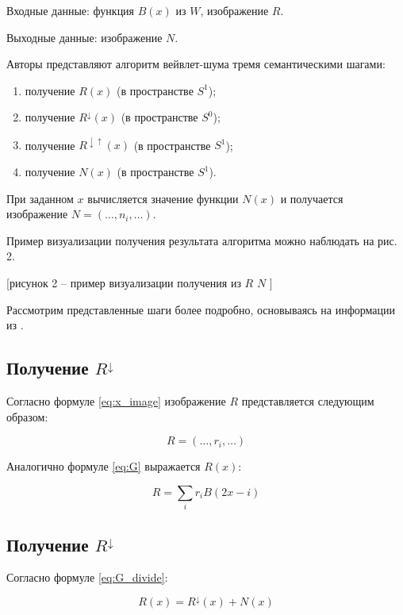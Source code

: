 Входные данные: функция $B(x)$ из $W$, изображение $R$.

Выходные данные: изображение $N$.

Авторы \cite{pixar} представляют алгоритм вейвлет-шума тремя семантическими шагами:

\begin{enumerate}
	\item получение $R(x)$ (в пространстве $S^1$);
	\item получение $R^\downarrow(x)$ (в пространстве $S^0$);
	\item получение $R^{\downarrow\uparrow}(x)$ (в пространстве $S^1$);
	\item получение $N(x)$ (в пространстве $S^1$).
\end{enumerate}

При заданном $x$ вычисляется значение функции $N(x)$ и получается изображение $N=(\dots,n_i,\dots)$.

Пример визуализации получения результата алгоритма можно наблюдать на рис. 2.

[рисунок 2 -- пример визуализации получения из $R$ $N$ \cite{pixar}]

Рассмотрим представленные шаги более подробно, основываясь на информации из \cite{pixar}.

\subsection{Получение $R^\downarrow$}

Согласно формуле \ref{eq:x_image} изображение $R$ представляется следующим образом:

\begin{equation}\label{eq:R_image}
	R=(\dots,r_i,\dots)
\end{equation}

Аналогично формуле \ref{eq:G} выражается $R(x)$:

\begin{equation}\label{eq:R}
	R=\sum_{i}r_i B(2x-i)
\end{equation}

\subsection{Получение $R^\downarrow$}

Согласно формуле \ref{eq:G_divide}:

\begin{equation}\label{eq:R_divide}
	R(x)=R^{\downarrow}(x)+N(x)
\end{equation}

